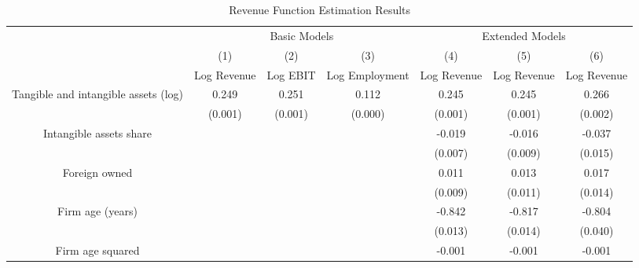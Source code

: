 \begin{table}[htbp]
\centering
\caption{Revenue Function Estimation Results}
\label{tab:revenuefunction}
\begin{tabular}{*{7}{c}}
\toprule
                    &\multicolumn{3}{c}{Basic Models}                                 &\multicolumn{3}{c}{Extended Models}                              \\\cmidrule(lr){2-4}\cmidrule(lr){5-7}
                    &\multicolumn{1}{c}{(1)}&\multicolumn{1}{c}{(2)}&\multicolumn{1}{c}{(3)}&\multicolumn{1}{c}{(4)}&\multicolumn{1}{c}{(5)}&\multicolumn{1}{c}{(6)}\\
                    &\multicolumn{1}{c}{Log Revenue}&\multicolumn{1}{c}{Log EBIT}&\multicolumn{1}{c}{Log Employment}&\multicolumn{1}{c}{Log Revenue}&\multicolumn{1}{c}{Log Revenue}&\multicolumn{1}{c}{Log Revenue}\\
\midrule
Tangible and intangible assets (log)&       0.249\sym{***}&       0.251\sym{***}&       0.112\sym{***}&       0.245\sym{***}&       0.245\sym{***}&       0.266\sym{***}\\
                    &     (0.001)         &     (0.001)         &     (0.000)         &     (0.001)         &     (0.001)         &     (0.002)         \\
[1em]
Intangible assets share&                     &                     &                     &      -0.019\sym{**} &      -0.016\sym{*}  &      -0.037\sym{**} \\
                    &                     &                     &                     &     (0.007)         &     (0.009)         &     (0.015)         \\
[1em]
Foreign owned       &                     &                     &                     &       0.011         &       0.013         &       0.017         \\
                    &                     &                     &                     &     (0.009)         &     (0.011)         &     (0.014)         \\
[1em]
Firm age (years)    &                     &                     &                     &      -0.842\sym{***}&      -0.817\sym{***}&      -0.804\sym{***}\\
                    &                     &                     &                     &     (0.013)         &     (0.014)         &     (0.040)         \\
[1em]
Firm age squared    &                     &                     &                     &      -0.001\sym{***}&      -0.001\sym{***}&      -0.001\sym{***}\\

\end{tabular}
\end{table}
